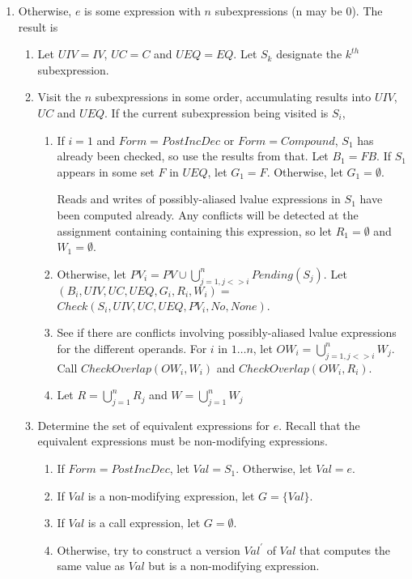 \begin{enumerate}
\item Otherwise, $e$ is some expression with $n$ subexpressions (n may be 0).  The
result is 
\label{list:check-unordered-operands}
\begin{enumerate}
\item Let  $\mathit{UIV} = IV$, $\mathit{UC} = C$ and $UEQ = EQ$.  
        Let $S_k$ designate the $k^{th}$ subexpression.
\item Visit the $n$ subexpressions in some order, accumulating results into $\mathit{UIV}$, $\mathit{UC}$
         and $UEQ$.  If the current subexpression being visited is $S_i$,
\begin{enumerate}
\item If $i = 1$ and $Form = PostIncDec$ or $Form = Compound$, $S_1$ has already
been checked, so use the results from that.  Let $B_1 = FB$.  If $S_1$ appears in some set $F$ in $UEQ$,
 let $G_1 = F$. Otherwise, let $G_1 = \emptyset$.    
 
 Reads and writes of possibly-aliased lvalue expressions in $S_1$ have been computed already. 
 Any conflicts will be detected at the assignment containing containing this expression, 
 so let $R_1 = \emptyset$ and $W_1 = \emptyset$.
\item Otherwise,  let $PV_i = PV \cup \bigcup_{j= 1, j <> i}^{n} Pending(S_j)$.
Let $(B_i, \mathit{UIV}, \mathit{UC}, UEQ, G_i, R_i, W_i) =$  
     $Check(S_i, \mathit{UIV}, \mathit{UC}, UEQ, PV_i, No, None)$.
\item See if there are conflicts involving possibly-aliased lvalue expressions for the different
operands. For $i$ in $1 \ldots n$,
let $OW_{i} = \bigcup_{j= 1, j <> i}^{n} W_j$. Call $CheckOverlap(OW_{i}, W_{i})$ and
$CheckOverlap(OW_{i}, R_{i})$.
\item Let $R = \bigcup_{j=1}^{n} R_j$ and $W = \bigcup_{j=1}^{n} W_j$
\end{enumerate}
\item Determine the set of equivalent expressions for $e$.  Recall that the equivalent expressions must be non-modifying expressions.
\begin{enumerate}
\item  If $Form = PostIncDec$, let $Val = S_1$.  Otherwise, let $Val = e$.
\item If $Val$ is a non-modifying expression, let $G  = \{ Val \}$.
\item If $Val$ is a call expression, let $G = \emptyset$.
\item Otherwise, try to construct a version $Val^\prime$ of $Val$ that computes the same value 
      as $Val$ but is a non-modifying expression. 
      

\end{enumerate}
\end{enumerate}
\end{enumerate}
